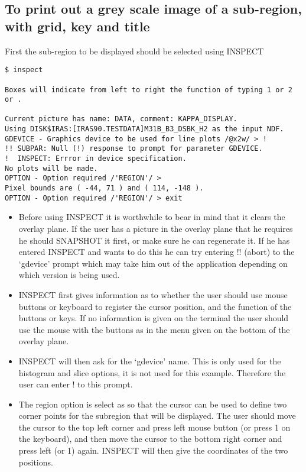 \documentclass[twoside,11pt]{article}
\begin{document}
\subsection{To print out a grey scale image of a sub-region, with grid, key 
and title}
\label{k:greysub}
First the sub-region to be displayed should be selected using INSPECT
\begin{small}
\begin{verbatim}
$ inspect

Boxes will indicate from left to right the function of typing 1 or 2 or .

Current picture has name: DATA, comment: KAPPA_DISPLAY.
Using DISK$IRAS:[IRAS90.TESTDATA]M31B_B3_DSBK_H2 as the input NDF.
GDEVICE - Graphics device to be used for line plots /@x2w/ > !
!! SUBPAR: Null (!) response to prompt for parameter GDEVICE.
!  INSPECT: Errror in device specification.
No plots will be made.
OPTION - Option required /'REGION'/ > 
Pixel bounds are ( -44, 71 ) and ( 114, -148 ).
OPTION - Option required /'REGION'/ > exit
\end{verbatim}
\end{small}
\begin{itemize}
\item Before using INSPECT it is worthwhile to bear in mind that it clears the
overlay plane. If the user has a picture in the overlay plane that he requires
he should SNAPSHOT it first, or make sure he can regenerate it.
If he has entered INSPECT and wants to do this he can try entering !! (abort) 
to the `gdevice' prompt which may take him out of the application depending on
which version is being used.
\item INSPECT first gives information as to whether the user should use mouse
buttons or keyboard to register the cursor position, and the function of the
buttons or keys. If no information is given on the terminal the user should use
the mouse with the buttons as in the menu given on the bottom of the overlay
plane.
\item INSPECT will then ask for the `gdevice' name. This is only used for the
histogram and slice options, it is not used for this example. Therefore the user
can enter ! to this prompt.
\item The region option is select as so that the cursor can be used to define
two corner points for the subregion that will be displayed. The user should
move the cursor to the top left corner and press left mouse button (or press 1
on the keyboard), and then move the cursor to the bottom right corner and press
left (or 1) again. INSPECT will then give the coordinates of the two positions.
\end{itemize}
\end{document}

